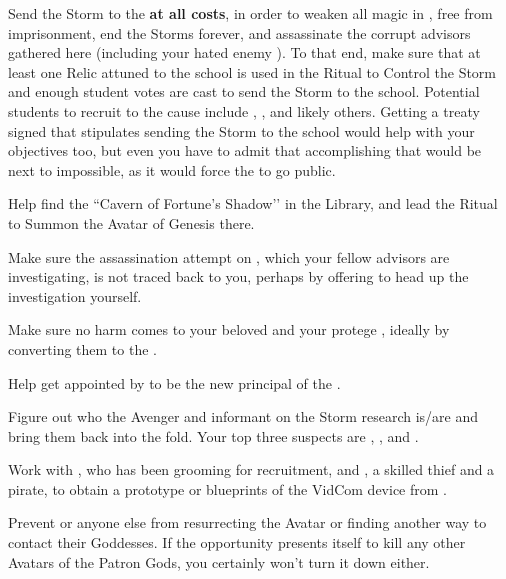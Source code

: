 \documentclass[char]{GL2020}
\begin{document}
\begin{itemz}
    \item Send the Storm to the \pSc{} \textbf{at all costs}, in order to weaken all magic in \pEarth{}, free \cGenesis{} from imprisonment, end the Storms forever, and assassinate the corrupt advisors gathered here (including your hated enemy \cJuniorStatesman{}). To that end, make sure that at least one Relic attuned to the school is used in the Ritual to Control the Storm and enough student votes are cast to send the Storm to the school. Potential students to recruit to the cause include \cInitiate{}, \cPirateChild{}, and likely others. Getting a treaty signed that stipulates sending the Storm to the school would help with your objectives too, but even you have to admit that accomplishing that would be next to impossible, as it would force the \pGoaties{} to go public.
    \item Help \cChupSecond{} find the ``Cavern of Fortune’s Shadow’’ in the Library, and lead the Ritual to Summon the Avatar of Genesis there.
    \item Make sure the assassination attempt on \cHeadDiplomat{}, which your fellow \pShippie{} advisors are investigating, is not traced back to you, perhaps by offering to head up the investigation yourself.
    \item Make sure no harm comes to your beloved \cCurse{\auncle} \cCurse{} and your protege \cPirateChild{}, ideally by converting them to the \pGoaties{}.
    \item Help \cChupSecond{} get appointed by \cPrincipal{} to be the new principal of the \pSchool{}.
    \item Figure out who the Avenger and informant on the Storm research is/are and bring them back into the fold. Your top three suspects are \cInterpol{\full}, \cChupAvenger{\full}, and \cWildCard{\full}.
    \item Work with \cChupInventor{}, who has been grooming \cTechStar{} for recruitment, and \cPirateChild{}, a skilled thief and a pirate, to obtain a prototype or blueprints of the VidCom device from \cTechStar{}.
    \item Prevent \cEbbPriest{} or anyone else from resurrecting the \cEbb{} Avatar or finding another way to contact their Goddesses. If the opportunity presents itself to kill any other Avatars of the Patron Gods, you certainly won't turn it down either. 

\end{itemz}
\end{document}
